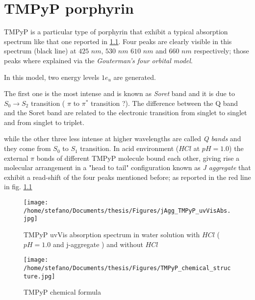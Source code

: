 
\chapter{TMPyP porphyrin} %



TMPyP is a particular type of porphyrin that exhibit a typical absorption spectrum like that one reported in \ref{fig:TMPyP_uvVis_abs}. Four peaks are clearly visible in this spectrum (black line) at $425$ $nm$, $530$ $nm$ $610$ $nm$ and $660$ $nm$  respectively; those peaks where explained via the \emph{Gouterman's four orbital model}.


In this model, two energy levels $1e_u$ are generated. 

The first one is the most intense and is known as \emph{Soret} band and it is due to $S_0\rightarrow S_2$ transition ( $\pi$ to $\pi^*$ transition ?). The difference between the Q band and the Soret band are related to the electronic transition from singlet to singlet and from singlet to triplet.


 while the other three less intense at higher wavelengths are called \emph{Q bands} and they come from $S_0$ to $S_1$ transition. In acid environment ($HCl$ at $pH = 1.0$) the external $\pi$ bonds of different TMPyP molecule bound each other, giving rise a molecular arrangement in a "head to tail" configuration known as \emph{J aggregate} that exhibit a read-shift of the four peaks mentioned before; as reported in the red line in fig. \ref{fig:TMPyP_uvVis_abs}


\begin{figure}[ht!]
	\centering %
		\texttt{[image: /home/stefano/Documents/thesis/Figures/jAgg\_TMPyP\_uvVisAbs.jpg]}
	\caption{TMPyP uvVis absorption spectrum in water solution with $HCl$ ($pH = 1.0$ and j-aggregate ) and without $HCl$  }
	\label{fig:TMPyP_uvVis_abs}
\end{figure}


\begin{figure}[ht!]
	\centering %
		\texttt{[image: /home/stefano/Documents/thesis/Figures/TMPyP\_chemical\_structure.jpg]}
	\caption{TMPyP chemical formula}
\end{figure}

